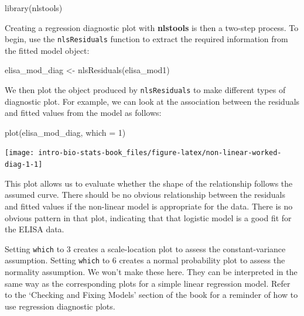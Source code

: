 \documentclass[
]{book}
\newenvironment{Shaded}{\begin{snugshade}}{\end{snugshade}}
\newcommand{\AttributeTok}[1]{\textcolor[rgb]{0.77,0.63,0.00}{#1}}
\newcommand{\DecValTok}[1]{\textcolor[rgb]{0.00,0.00,0.81}{#1}}
\newcommand{\FunctionTok}[1]{\textcolor[rgb]{0.00,0.00,0.00}{#1}}
\newcommand{\NormalTok}[1]{#1}
\newcommand{\OtherTok}[1]{\textcolor[rgb]{0.56,0.35,0.01}{#1}}
\begin{document}
\begin{Shaded}
\begin{Highlighting}[]
\FunctionTok{library}\NormalTok{(nlstools)}
\end{Highlighting}
\end{Shaded}

Creating a regression diagnostic plot with \textbf{nlstools} is then a two-step process. To begin, use the \texttt{nlsResiduals} function to extract the required information from the fitted model object:

\begin{Shaded}
\begin{Highlighting}[]
\NormalTok{elisa\_mod\_diag }\OtherTok{\textless{}{-}} \FunctionTok{nlsResiduals}\NormalTok{(elisa\_mod1)}
\end{Highlighting}
\end{Shaded}

We then plot the object produced by \texttt{nlsResiduals} to make different types of diagnostic plot. For example, we can look at the association between the residuals and fitted values from the model as follows:

\begin{Shaded}
\begin{Highlighting}[]
\FunctionTok{plot}\NormalTok{(elisa\_mod\_diag, }\AttributeTok{which =} \DecValTok{1}\NormalTok{)}
\end{Highlighting}
\end{Shaded}

\begin{center}\texttt{[image: intro-bio-stats-book\_files/figure-latex/non-linear-worked-diag-1-1]} \end{center}

This plot allows us to evaluate whether the shape of the relationship follows the assumed curve. There should be no obvious relationship between the residuals and fitted values if the non-linear model is appropriate for the data. There is no obvious pattern in that plot, indicating that that logistic model is a good fit for the ELISA data.

Setting \texttt{which} to 3 creates a scale-location plot to assess the constant-variance assumption. Setting \texttt{which} to 6 creates a normal probability plot to assess the normality assumption. We won't make these here. They can be interpreted in the same way as the corresponding plots for a simple linear regression model. Refer to the `Checking and Fixing Models' section of the book for a reminder of how to use regression diagnostic plots.
\end{document}
